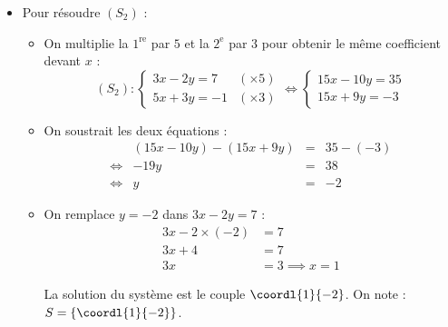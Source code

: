 \begin{ex}
\begin{correction}
\begin{itemize}
\begin{itemize}
				      \item On remplace $y = -1$ dans la première équation $3x - 2y = 11$ :
				            \[
					            \begin{array}{rrcl}
						                 & 3x - 2 \times (-1) & = & 11               \\
						            \iff & 3x + 2             & = & 11               \\
						            \iff & 3x                 & = & 9 \implies x = 3
					            \end{array}
				            \]

				            La solution du système est le couple $\coordl{3}{-1}$. On note : $S = \{\coordl{3}{-1}\}$.
			      \end{itemize}

			\item Pour résoudre $(S_2)$ :
			      \begin{itemize}
				      \item On multiplie la $1^\text{re}$ par $5$ et la $2^\text{e}$ par $3$ pour obtenir le même coefficient devant $x$ :
				            \[
					            (S_2):\begin{cases}
						            3x - 2y = 7  & (\times 5) \\
						            5x + 3y = -1 & (\times 3)
					            \end{cases}
					            \iff
					            \begin{cases}
						            15x - 10y = 35 \\
						            15x + 9y = -3
					            \end{cases}
				            \]

				      \item On soustrait les deux équations :
				            \[
					            \begin{array}{rrcl}
						                 & (15x - 10y) - (15x + 9y) & = & 35 - (-3) \\
						            \iff & -19y                     & = & 38        \\
						            \iff & y                        & = & -2
					            \end{array}
				            \]

				      \item On remplace $y = -2$ dans $3x - 2y = 7$ :
				            \begin{align*}
					            3x - 2 \times (-2) & = 7                \\
					            3x + 4             & = 7                \\
					            3x                 & = 3 \implies x = 1
				            \end{align*}

				            La solution du système est le couple $\coordl{1}{-2}$. On note : $S = \{\coordl{1}{-2}\}$.
			      \end{itemize}
		\end{itemize}
	\end{correction}
\end{ex}


